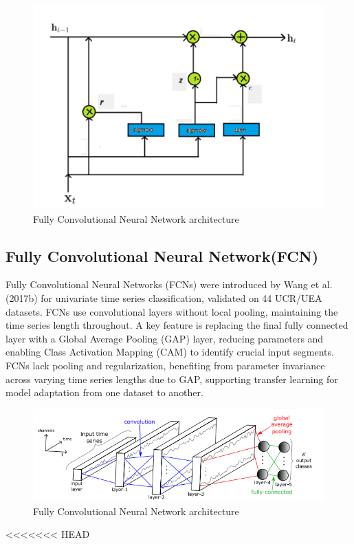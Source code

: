 \documentclass{ieeeojies}
\begin{document}
\begin{figure}[H]
    \centering
\begin{minipage}{0.5\textwidth}
        \centering
        \includegraphics[width=\textwidth]{bibliography/Figure/GRU_diagram.png}
        \caption{Fully Convolutional Neural Network architecture}
        \label{fig:3}
\end{minipage}
\end{figure}

\subsection{Fully Convolutional Neural Network(FCN)}
Fully Convolutional Neural Networks (FCNs) were introduced by Wang et al. (2017b) for univariate time series classification, validated on 44 UCR/UEA datasets. FCNs use convolutional layers without local pooling, maintaining the time series length throughout. A key feature is replacing the final fully connected layer with a Global Average Pooling (GAP) layer, reducing parameters and enabling Class Activation Mapping (CAM) to identify crucial input segments. 
FCNs lack pooling and regularization, benefiting from parameter invariance across varying time series lengths due to GAP, supporting transfer learning for model adaptation from one dataset to another.\cite{Ismail}

\begin{figure}[H]
    \centering
\begin{minipage}{0.5\textwidth}
        \centering
        \includegraphics[width=\textwidth]{bibliography/Figure/FCN.png}
        \caption{Fully Convolutional Neural Network architecture}
        \label{fig:3}
\end{minipage}
\end{figure}
<<<<<<< HEAD
\end{document}
